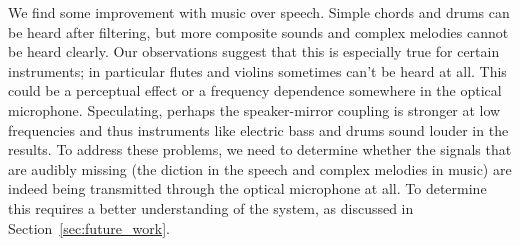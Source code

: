 \documentclass[paper-main.tex]{subfiles}
\begin{document}
We find some improvement with music over speech. 
Simple chords and drums can be heard after filtering, but more composite sounds and complex melodies cannot be heard clearly. 
Our observations suggest that this is especially true for certain instruments; in particular flutes and violins sometimes can’t be heard at all. 
This could be a perceptual effect or a frequency dependence somewhere in the optical microphone.
Speculating, perhaps the speaker-mirror coupling is stronger at low frequencies and thus instruments like electric bass and drums sound louder in the results.
To address these problems, we need to determine whether the signals that are audibly missing (the diction in the speech and complex melodies in music) are indeed being transmitted through the optical microphone at all. 
To determine this requires a better understanding of the system, as discussed in Section~\ref{sec:future_work}.
\end{document}
